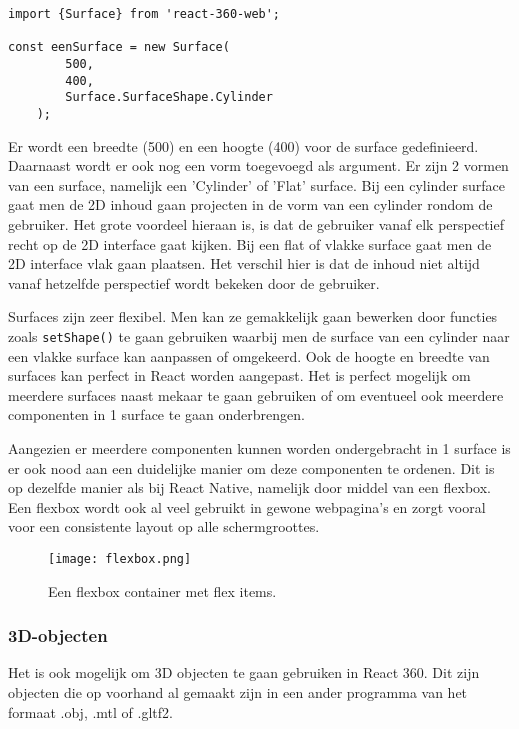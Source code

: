 \begin{lstlisting}[frame=single, caption=Voorbeeld van een surface]
import {Surface} from 'react-360-web';

const eenSurface = new Surface(
		500,
		400,
		Surface.SurfaceShape.Cylinder
	);
\end{lstlisting}

Er wordt een breedte (500) en een hoogte (400) voor de surface gedefinieerd. Daarnaast wordt er ook nog een vorm toegevoegd als argument. Er zijn 2 vormen van een surface, namelijk een 'Cylinder' of 'Flat' surface. Bij een cylinder surface gaat men de 2D inhoud gaan projecten in de vorm van een cylinder rondom de gebruiker. Het grote voordeel hieraan is, is dat de gebruiker vanaf elk perspectief recht op de 2D interface gaat kijken. Bij een flat of vlakke surface gaat men de 2D interface vlak gaan plaatsen. Het verschil hier is dat de inhoud niet altijd vanaf hetzelfde perspectief wordt bekeken door de gebruiker.

Surfaces zijn zeer flexibel. Men kan ze gemakkelijk gaan bewerken door functies zoals \lstinline[basicstyle=\ttfamily\color{red}]|setShape()| te gaan gebruiken waarbij men de surface van een cylinder naar een vlakke surface kan aanpassen of omgekeerd. Ook de hoogte en breedte van surfaces kan perfect in React worden aangepast. Het is perfect mogelijk om meerdere surfaces naast mekaar te gaan gebruiken of om eventueel ook meerdere componenten in 1 surface te gaan onderbrengen. 

Aangezien er meerdere componenten kunnen worden ondergebracht in 1 surface is er ook nood aan een duidelijke manier om deze componenten te ordenen. Dit is op dezelfde manier als bij React Native, namelijk door middel van een flexbox. Een flexbox wordt ook al veel gebruikt in gewone webpagina's en zorgt vooral voor een consistente layout op alle schermgroottes.

\begin{figure}[h]
	\centering
	\texttt{[image: flexbox.png]}
	\caption{Een flexbox container met flex items.}
	\label{fig:flexbox}
\end{figure}

\subsubsection{3D-objecten}
\label{ssubsec:3d-objecten}
Het is ook mogelijk om 3D objecten te gaan gebruiken in React 360. Dit zijn objecten die op voorhand al gemaakt zijn in een ander programma van het formaat .obj, .mtl of .gltf2.

